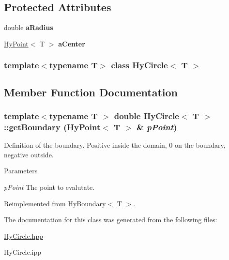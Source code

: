 \subsection*{Protected Attributes}
\begin{DoxyCompactItemize}
\item 
\hypertarget{classHyCircle_a7df9d0c4404401ba9f661aad0bd7bc6e}{
double {\bfseries aRadius}}
\label{classHyCircle_a7df9d0c4404401ba9f661aad0bd7bc6e}

\item 
\hypertarget{classHyCircle_adf84a8e946e0fb915d313ba0051c5b23}{
\hyperlink{classHyPoint}{HyPoint}$<$ T $>$ {\bfseries aCenter}}
\label{classHyCircle_adf84a8e946e0fb915d313ba0051c5b23}

\end{DoxyCompactItemize}
\subsubsection*{template$<$typename T$>$ class HyCircle$<$ T $>$}



\subsection{Member Function Documentation}
\hypertarget{classHyCircle_aed6e84c3e2e99b8f84aa1b723224f4c5}{
\subsubsection[{getBoundary}]{\setlength{\rightskip}{0pt plus 5cm}template$<$typename T $>$ double {\bf HyCircle}$<$ T $>$::getBoundary ({\bf HyPoint}$<$ T $>$ \& {\em pPoint})}}
\label{classHyCircle_aed6e84c3e2e99b8f84aa1b723224f4c5}


Definition of the boundary. Positive inside the domain, 0 on the boundary, negative outside. 


\begin{DoxyParams}{Parameters}
\item[{\em pPoint}]The point to evalutate. \end{DoxyParams}


Reimplemented from \hyperlink{classHyBoundary_a138c96a97075dc41eead25963c1bf785}{HyBoundary$<$ T $>$}.



The documentation for this class was generated from the following files:\begin{DoxyCompactItemize}
\item 
\hyperlink{HyCircle_8hpp}{HyCircle.hpp}\item 
HyCircle.ipp\end{DoxyCompactItemize}
